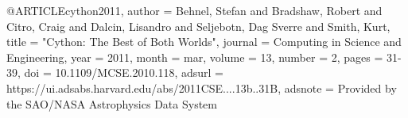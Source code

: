 
@ARTICLE{cython2011,
       author = {{Behnel}, Stefan and {Bradshaw}, Robert and {Citro}, Craig and {Dalcin}, Lisandro and {Seljebotn}, Dag Sverre and {Smith}, Kurt},
        title = "{Cython: The Best of Both Worlds}",
      journal = {Computing in Science and Engineering},
         year = 2011,
        month = mar,
       volume = {13},
       number = {2},
        pages = {31-39},
          doi = {10.1109/MCSE.2010.118},
       adsurl = {https://ui.adsabs.harvard.edu/abs/2011CSE....13b..31B},
      adsnote = {Provided by the SAO/NASA Astrophysics Data System}
}
